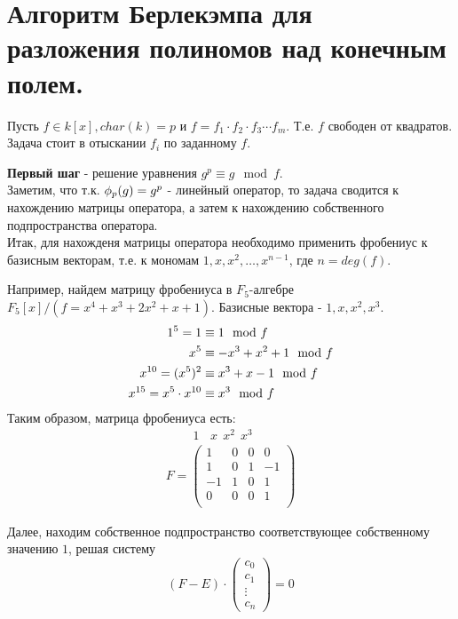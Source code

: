 \section{Алгоритм Берлекэмпа для разложения полиномов над конечным полем.}

Пусть $f \in k[x], char(k) = p$ и $f = f_1 \cdot f_2 \cdot f_3 \cdots f_m$. Т.е. $f$ свободен от квадратов. \\
Задача стоит в отыскании $f_i$ по заданному $f$.

\textbf{Первый шаг} - решение уравнения $g^p \equiv g \mod f$.\\
Заметим, что т.к. $\phi_{p}(g) = g^p$ - линейный оператор, то задача сводится к нахождению матрицы оператора, а затем к
нахождению собственного подпространства оператора. \\
Итак, для нахожденя матрицы оператора необходимо применить фробениус к базисным векторам, т.е. к мономам $1, x, x^2,
\dots, x^{n - 1}$, где $n = deg(f)$.

Например, найдем матрицу фробениуса в $F_5$-алгебре $F_5[x] / (f = x^4+x^3+2x^2+x+1)$. Базисные вектора - $1, x, x^2, x^3$.
\begin{align}
1^5 = 1 &\equiv 1 \mod f \notag \\
x^5 &\equiv -x^3 + x^2 + 1 \mod f \notag \\
x^{10} = (x^5)^2 &\equiv x^3 + x - 1 \mod f \notag \\
x^{15} = x^5 \cdot x^{10} &\equiv x^3 \mod f \notag 
\end{align}
Таким образом, матрица фробениуса есть:
\[
\begin{array}{l}
~~~~~~~~~~1~~~~x~~x^2~~x^3 \\
F = 
\begin{pmatrix}
1 & 0 & 0 & 0 \\
1 & 0 & 1 & -1 \\
-1 & 1 & 0 & 1 \\
0 & 0 & 0 & 1 \\ 
\end{pmatrix}
\end{array}
\]

Далее, находим собственное подпространство соответствующее собственному значению $1$, решая систему 
\[(F - E) \cdot \begin{pmatrix} c_0 \\ c_1\\ \vdots \\ c_n \end{pmatrix} = 0\]

